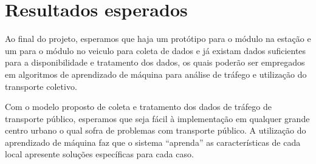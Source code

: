 \documentclass[12pt,cor2018]{uftpibic}
\begin{document}
\vspace{1.5cm}
\chapter{Resultados esperados}

Ao final do projeto, esperamos que haja um protótipo para o módulo na estação e um para o módulo no veiculo para coleta de dados e já existam dados suficientes para a disponibilidade e tratamento dos dados, os quais poderão ser empregados em algoritmos de aprendizado de máquina para análise de tráfego e utilização do transporte coletivo.

Com o modelo proposto de coleta e tratamento dos dados de tráfego de transporte público, esperamos que seja fácil à implementação em qualquer grande centro urbano o qual sofra de problemas com transporte público. A utilização do aprendizado de máquina faz que o sistema ``aprenda'' as características de cada local apresente soluções específicas para cada caso.

\vspace{1.25cm}

\end{document}

